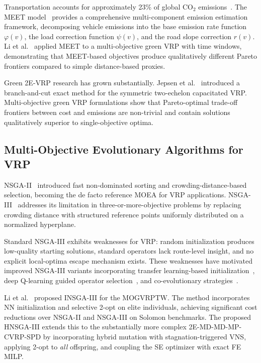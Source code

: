 \documentclass[11pt, a4paper]{article}
\numberwithin{equation}{section}
\begin{document}
Transportation accounts for approximately 23\% of global CO$_2$
emissions~\cite{iea2022}.  The MEET model~\cite{hickman1999} provides a
comprehensive multi-component emission estimation framework, decomposing
vehicle emissions into the base emission rate function $\varphi(v)$, the load
correction function $\psi(v)$, and the road slope correction $r(v)$.
Li et al.~\cite{li2025} applied MEET to a multi-objective green VRP with time
windows, demonstrating that MEET-based objectives produce qualitatively
different Pareto frontiers compared to simple distance-based proxies.

Green 2E-VRP research has grown substantially.  Jepsen
et al.~\cite{jepsen2013} introduced a branch-and-cut exact method for the
symmetric two-echelon capacitated VRP\@.  Multi-objective green VRP
formulations show that Pareto-optimal trade-off frontiers between cost and
emissions are non-trivial and contain solutions qualitatively superior to
single-objective optima.

\subsection{Multi-Objective Evolutionary Algorithms for VRP}

NSGA-II~\cite{deb2002nsga2} introduced fast non-dominated sorting and
crowding-distance-based selection, becoming the de facto reference MOEA for VRP
applications.  NSGA-III~\cite{deb2014nsga3} addresses its limitation in
three-or-more-objective problems by replacing crowding distance with structured
reference points uniformly distributed on a normalized hyperplane.

Standard NSGA-III exhibits weaknesses for VRP: random initialization produces
low-quality starting solutions, standard operators lack route-level insight,
and no explicit local-optima escape mechanism exists.  These weaknesses have
motivated improved NSGA-III variants incorporating transfer learning-based
initialization~\cite{improvedNSGA3transfer}, deep Q-learning guided operator
selection~\cite{dqlNSGA3}, and co-evolutionary strategies~\cite{coevNSGA3}.

Li et al.~\cite{li2025} proposed INSGA-III for the MOGVRPTW\@.  The method
incorporates NN initialization and selective 2-opt on elite individuals,
achieving significant cost reductions over NSGA-II and NSGA-III on Solomon
benchmarks.
The proposed HNSGA-III extends this to the substantially more complex
2E-MD-MD-MP-CVRP-SPD by incorporating hybrid mutation with
stagnation-triggered VNS, applying 2-opt to \emph{all} offspring, and
coupling the SE optimizer with exact FE MILP\@.
\end{document}
